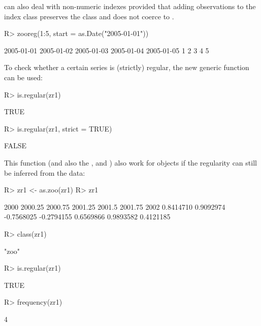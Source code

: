 \documentclass{Z}
\begin{document}
 can also deal with non-numeric indexes provided that adding 
observations to the index class preserves the class and does not coerce to .

\begin{Schunk}
\begin{Sinput}
R> zooreg(1:5, start = as.Date("2005-01-01"))
\end{Sinput}
\begin{Soutput}
2005-01-01 2005-01-02 2005-01-03 2005-01-04 2005-01-05 
         1          2          3          4          5 
\end{Soutput}
\end{Schunk}


To check whether a certain series is (strictly) regular, the new generic function
 can be used:

\begin{Schunk}
\begin{Sinput}
R> is.regular(zr1)
\end{Sinput}
\begin{Soutput}
[1] TRUE
\end{Soutput}
\begin{Sinput}
R> is.regular(zr1, strict = TRUE)
\end{Sinput}
\begin{Soutput}
[1] FALSE
\end{Soutput}
\end{Schunk}

This function (and also the ,  and ) also 
work for  objects if the regularity can still be inferred from the data:

\begin{Schunk}
\begin{Sinput}
R> zr1 <- as.zoo(zr1)
R> zr1
\end{Sinput}
\begin{Soutput}
      2000    2000.25    2000.75    2001.25     2001.5    2001.75       2002 
 0.8414710  0.9092974 -0.7568025 -0.2794155  0.6569866  0.9893582  0.4121185 
\end{Soutput}
\begin{Sinput}
R> class(zr1)
\end{Sinput}
\begin{Soutput}
[1] "zoo"
\end{Soutput}
\begin{Sinput}
R> is.regular(zr1)
\end{Sinput}
\begin{Soutput}
[1] TRUE
\end{Soutput}
\begin{Sinput}
R> frequency(zr1)
\end{Sinput}
\begin{Soutput}
[1] 4
\end{Soutput}
\end{Schunk}
\end{document}
